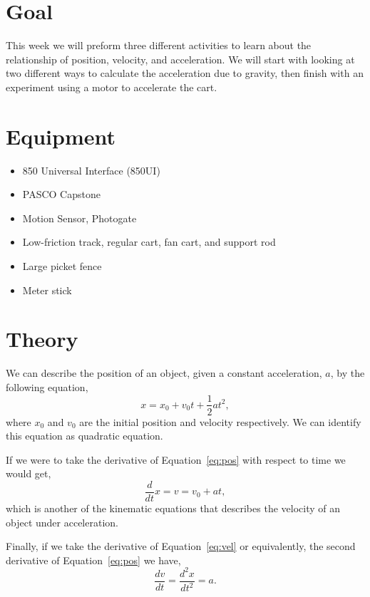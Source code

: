 \documentclass[main.tex]{subfiles}
\begin{document}
\section*{Goal}
This week we will preform three different activities to learn about the relationship of position, velocity, and acceleration. We will start with looking at two different ways to calculate the acceleration due to gravity, then finish with an experiment using a motor to accelerate the cart.

\section*{Equipment}
\begin{itemize}
\item
850 Universal Interface (850UI)
\item
PASCO Capstone
\item
Motion Sensor, Photogate
\item
Low-friction track, regular cart, fan cart, and support rod
\item
Large picket fence
\item
Meter stick
\end{itemize}

\section*{Theory}
We can describe the position of an object, given a constant acceleration, $a$, by the following equation,
\begin{equation} \label{eq:pos}
x=x_0+v_0 t+\frac{1}{2}at^2,
\end{equation}
where $x_0$ and $v_0$ are the initial position and velocity respectively. We can identify this equation as quadratic equation.

If we were to take the derivative of Equation~\eqref{eq:pos} with respect to time we would get,
\begin{equation} \label{eq:vel}
\frac{d}{dt}x=v=v_0+at,
\end{equation}
which is another of the kinematic equations that describes the velocity of an object under acceleration.

Finally, if we take the derivative of Equation~\eqref{eq:vel} or equivalently, the second derivative of Equation~\eqref{eq:pos} we have,
\begin{equation} \label{eq:acc}
\frac{dv}{dt}=\frac{d^2 x}{dt^2}=a.
\end{equation}
\end{document}
